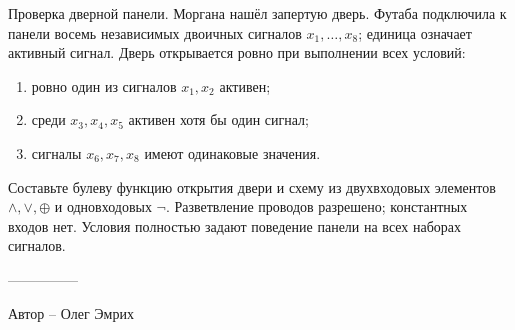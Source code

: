 \question
Проверка дверной панели. Моргана нашёл запертую дверь. Футаба подключила к панели восемь независимых двоичных сигналов $x_1,\ldots,x_8$; единица означает активный сигнал. Дверь открывается ровно при выполнении всех условий:
\begin{enumerate}
\item ровно один из сигналов $x_1,x_2$ активен;
\item среди $x_3,x_4,x_5$ активен хотя бы один сигнал;
\item сигналы $x_6,x_7,x_8$ имеют одинаковые значения.
\end{enumerate}
Составьте булеву функцию открытия двери и схему из двухвходовых элементов $\land,\lor,\oplus$ и одновходовых $\neg$. Разветвление проводов разрешено; константных входов нет. Условия полностью задают поведение панели на всех наборах сигналов.

---------------

Автор -- Олег Эмрих
